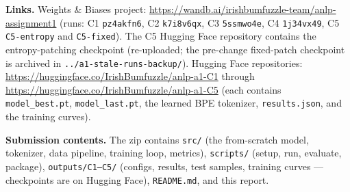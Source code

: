\documentclass[11pt]{article}
\begin{document}
\textbf{Links.} Weights \& Biases project:
\url{https://wandb.ai/irishbumfuzzle-team/anlp-assignment1} (runs: C1
\texttt{pz4akfn6}, C2 \texttt{k7i8v6qx}, C3 \texttt{5ssmwo4e}, C4
\texttt{1j34vx49}, C5 \texttt{C5-entropy} and \texttt{C5-fixed}). %
The C5 Hugging Face repository contains the entropy-patching checkpoint
(re-uploaded; the pre-change fixed-patch checkpoint is archived in
\texttt{../a1-stale-runs-backup/}). Hugging Face repositories:
\url{https://huggingface.co/IrishBumfuzzle/anlp-a1-C1} through
\url{https://huggingface.co/IrishBumfuzzle/anlp-a1-C5} (each contains
\texttt{model\_best.pt}, \texttt{model\_last.pt}, the learned BPE tokenizer,
\texttt{results.json}, and the training curves).

\textbf{Submission contents.} The zip contains \texttt{src/} (the from-scratch
model, tokenizer, data pipeline, training loop, metrics), \texttt{scripts/}
(setup, run, evaluate, package), \texttt{outputs/C1--C5/} (configs, results,
test samples, training curves --- checkpoints are on Hugging Face),
\texttt{README.md}, and this report.
\end{document}
